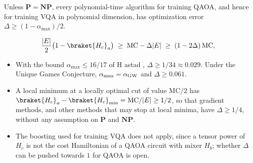 \documentclass[handoutsbeamer.tex]{subfiles}
\begin{document}
\begin{frame}
\onp{\footnotesize}
\begin{cor}\label{cor:ch05:qaoa}
Unless $\mathbf P = \mathbf{NP}$, every polynomial-time algorithm for training QAOA, and hence for training VQA in polynomial dimension, has optimization error $\Delta\ge(1-\alpha_{\max})/2$.
\end{cor}
\begin{equation}
    \frac{|E|}2\big(1-\braket{H_c}_a\big) \;\ge\; \mathrm{MC} - \Delta|E| \;\ge\; (1-2\Delta)\,\mathrm{MC},
\end{equation}
\begin{itemize}\setlength\itemsep{0.2em}
    \item With the bound $\alpha_{\max}\le16/17$ of H astad \citep{Hstad2001}, $\Delta\ge1/34\approx0.029$. Under the Unique Games Conjecture, $\alpha_{\max} = \alpha_{\rm GW}$ and $\Delta\ge0.061$.
    \item A local minimum at a locally optimal cut of value $\mathrm{MC}/2$ has $\braket{H_c}_a - \braket{H_c}_{\min} = \mathrm{MC}/|E|\ge1/2$, so that gradient methods, and other methods that may stop at local minima, have $\Delta\ge1/4$, without any assumption on $\mathbf P$ and $\mathbf{NP}$.
    \item The boosting used for training VQA does not apply, since a tensor power of $H_c$ is not the cost Hamiltonian of a QAOA circuit with mixer $H_b$; whether $\Delta$ can be pushed towards $1$ for QAOA is open.
\end{itemize}
\end{frame}
\end{document}
